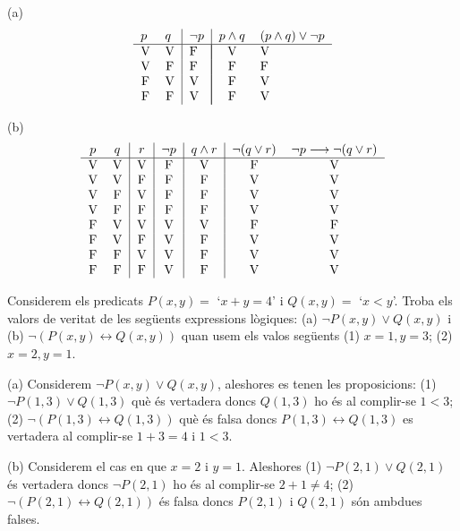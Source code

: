 \begin{solucio}
(a)%
\[%
\begin{tabular}
[c]{ll|l|ll}%
$p$ & $q$ & $\lnot p$ & $p\wedge q$ & $(p\wedge q)\vee\lnot p$\\\hline
\multicolumn{1}{c}{V} & \multicolumn{1}{c|}{V} & F & \multicolumn{1}{|c}{V} &
V\\
\multicolumn{1}{c}{V} & \multicolumn{1}{c|}{F} & F & \multicolumn{1}{|c}{F} &
F\\
\multicolumn{1}{c}{F} & \multicolumn{1}{c|}{V} & V & \multicolumn{1}{|c}{F} &
V\\
\multicolumn{1}{c}{F} & \multicolumn{1}{c|}{F} & V & \multicolumn{1}{|c}{F} &
V
\end{tabular}
\]


(b)%
\[%
\begin{tabular}
[c]{cc|c|c|c|cc}%
$p$ & $q$ & $r$ & $\lnot p$ & $q\wedge r$ & $\lnot(q\vee r)$ & $\lnot
p\longrightarrow\lnot(q\vee r)$\\\hline
V & V & V & F & V & F & V\\
V & V & F & F & F & V & V\\
V & F & V & F & F & V & V\\
V & F & F & F & F & V & V\\
F & V & V & V & V & F & F\\
F & V & F & V & F & V & V\\
F & F & V & V & F & V & V\\
F & F & F & V & F & V & V
\end{tabular}
\]

\end{solucio}

\begin{exer}
Considerem els predicats $P(x,y)=$ `$x+y=4$' i $Q(x,y)=$ `$x<y$'. Troba els
valors de veritat de les seg\"{u}ents expressions l\`{o}giques: (a) $\lnot
P(x,y)\vee Q(x,y)$ i (b) $\lnot(P(x,y)\longleftrightarrow Q(x,y))$ quan usem
els valos seg\"{u}ents (1) $x=1,y=3$; (2) $x=2,y=1$.
\end{exer}

\begin{solucio}
(a) Considerem $\lnot P(x,y)\vee Q(x,y)$, aleshores es tenen les proposicions:
(1) $\lnot P(1,3)\vee Q(1,3)$ qu\`{e} \'{e}s vertadera doncs $Q(1,3)$ ho
\'{e}s al complir-se $1<3$; (2) $\lnot(P(1,3)\longleftrightarrow Q(1,3))$
qu\`{e} \'{e}s falsa doncs $P(1,3)\longleftrightarrow Q(1,3)$ es vertadera al
complir-se $1+3=4$ i $1<3$.

(b) Considerem el cas en que $x=2$ i $y=1$. Aleshores (1) $\lnot P(2,1)\vee
Q(2,1)$ \'{e}s vertadera doncs $\lnot P(2,1)$ ho \'{e}s al complir-se
$2+1\neq4$; (2) $\lnot(P(2,1)\longleftrightarrow Q(2,1))$ \'{e}s falsa doncs
$P(2,1)$ i $Q(2,1)$ s\'{o}n ambdues falses.
\end{solucio}


